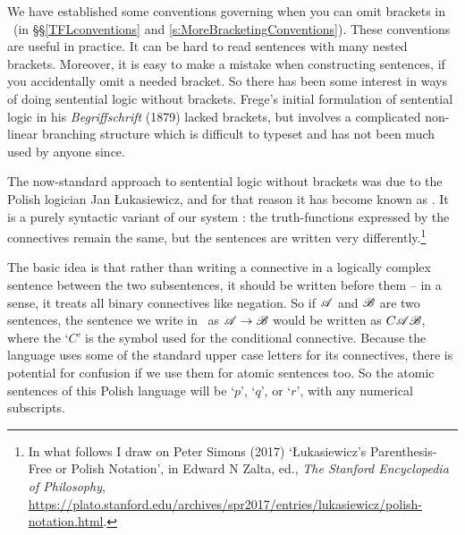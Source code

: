 We have established some conventions governing when you can omit brackets in \TFL\ (in §§\ref{TFLconventions} and \ref{s:MoreBracketingConventions}). These conventions are useful in practice. It can be hard to read sentences with many nested brackets. Moreover, it is easy to make a mistake when constructing sentences, if you accidentally omit a needed bracket. So there has been some interest in ways of doing sentential logic without brackets. Frege's initial formulation of sentential logic in his \emph{Begriffschrift} (1879) lacked brackets, but involves a complicated non-linear branching structure which is difficult to typeset and has not been much used by anyone since.

The now-standard approach to sentential logic without brackets was due to the Polish logician Jan Łukasiewicz, and for that reason it has become known as . It is a purely syntactic variant of our system \TFL: the truth-functions expressed by the connectives remain the same, but the sentences are written very differently.\footnote{In what follows I draw on Peter Simons (2017) `Łukasiewicz's Parenthesis-Free or Polish Notation', in Edward N Zalta, ed., \emph{The Stanford Encyclopedia of Philosophy}, \url{https://plato.stanford.edu/archives/spr2017/entries/lukasiewicz/polish-notation.html}.}

The basic idea is that rather than writing a connective in a logically complex sentence between the two subsentences, it should be written before them – in a sense, it treats all binary connectives like negation. So if $\mathscr{A}$ and $\mathscr{B}$ are two sentences, the sentence we write in \TFL\ as $\mathscr{A} \rightarrow \mathscr{B}$ would be written as $C\mathscr{A}\mathscr{B}$, where the `$C$' is the symbol used for the conditional connective. Because the language uses some of the standard upper case letters for its connectives, there is potential for confusion if we use them for atomic sentences too. So the atomic sentences of this Polish language will be `$p$', `$q$', or `$r$', with any numerical subscripts. 

